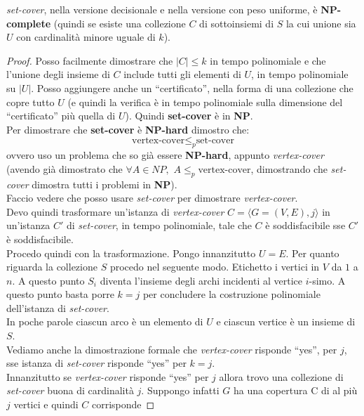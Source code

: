 \documentclass[a4paper,12pt, oneside]{book}
\begin{document}
\begin{teorema}
  \textit{set-cover}, nella versione decisionale e nella
  versione con peso uniforme, è \textbf{NP-complete} (quindi se esiste una
  collezione $C$ di sottoinsiemi di $S$ 
  la cui unione sia $U$ con cardinalità minore uguale di $k$).
\end{teorema}
\begin{proof}
  Posso facilmente dimostrare che $|C|\leq k$ in tempo polinomiale e che
  l'unione degli insieme di $C$ include tutti gli elementi di $U$, in
  tempo polinomiale su $|U|$. Posso aggiungere anche un ``certificato'', nella
  forma di una collezione che copre tutto $U$ (e quindi la verifica è in tempo
  polinomiale sulla dimensione del ``certificato'' più quella di $U$). Quindi
  \textbf{set-cover} è in \textbf{NP}.\\
  Per dimostrare che \textbf{set-cover} è \textbf{NP-hard} dimostro che:
  \[\mbox{vertex-cover} \leq_p \mbox{set-cover}\]
  ovvero uso un problema che so già essere \textbf{NP-hard}, appunto
  \textit{vertex-cover} (avendo già dimostrato che $\forall A\in NP, \,\,A\leq_p
  \mbox{vertex-cover}$, dimostrando che \textit{set-cover} dimostra tutti i
  problemi in \textbf{NP}).\\
  Faccio vedere che posso usare \textit{set-cover} per dimostrare
  \textit{vertex-cover}.\\
  Devo quindi trasformare un'istanza di \textit{vertex-cover} $C=\langle
  G=(V,E), j\rangle$ in un'istanza $C'$ di \textit{set-cover}, in tempo
  polinomiale, tale che $C$ è soddisfacibile sse $C'$ è soddisfacibile.\\
  Procedo quindi con la trasformazione. Pongo innanzitutto $U=E$. Per quanto
  riguarda la collezione $S$ procedo nel seguente modo. Etichetto i vertici in
  $V$ da $1$ a $n$. A questo punto $S_i$ diventa l'insieme degli archi incidenti
  al vertice $i$-simo. A questo punto basta porre $k=j$ per concludere la
  costruzione polinomiale dell'istanza di \textit{set-cover}.\\
  In poche parole ciascun arco è un elemento di $U$ e ciascun vertice è un
  insieme di $S$.\\
  Vediamo anche la dimostrazione formale che \textit{vertex-cover} risponde
  ``yes'', per $j$, sse istanza di \textit{set-cover} risponde ``yes'' per
  $k=j$.\\
  Innanzitutto se \textit{vertex-cover} risponde ``yes'' per $j$ allora trovo
  una collezione di \textit{set-cover} buona di cardinalità $j$. Suppongo
  infatti $G$ ha una copertura C di al più $j$ vertici e quindi $C$ corrisponde

\end{proof}
\end{document}
